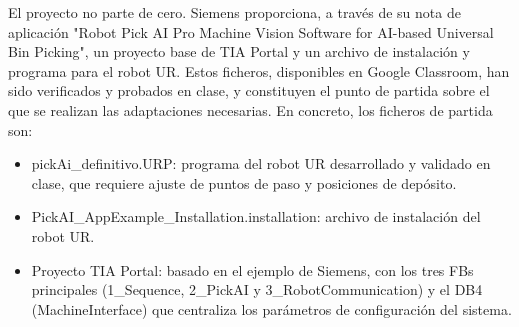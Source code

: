 
El proyecto no parte de cero. Siemens proporciona, a través de su nota de aplicación "Robot Pick AI Pro Machine Vision Software for AI-based Universal Bin Picking", un proyecto base de TIA Portal y un archivo de instalación y programa para el robot UR. Estos ficheros, disponibles en Google Classroom, han sido verificados y probados en clase, y constituyen el punto de partida sobre el que se realizan las adaptaciones necesarias.
En concreto, los ficheros de partida son:

\begin{itemize}
	\item pickAi\_definitivo.URP: programa del robot UR desarrollado y validado en clase, que requiere ajuste de puntos de paso y posiciones de depósito.

	\item PickAI\_AppExample\_Installation.installation: archivo de instalación del robot UR.

	\item Proyecto TIA Portal: basado en el ejemplo de Siemens, con los tres FBs principales (1\_Sequence, 2\_PickAI y 3\_RobotCommunication) y el DB4 (MachineInterface) que centraliza los parámetros de configuración del sistema.
\end{itemize}
